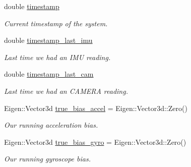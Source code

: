 \begin{DoxyCompactItemize}
\mbox{\label{classov__msckf_1_1Simulator_a159c617f73068f44833ed697255e5b86}} 
double \hyperlink{classov__msckf_1_1Simulator_a159c617f73068f44833ed697255e5b86}{timestamp}
\begin{DoxyCompactList}\small\item\em Current timestamp of the system. \end{DoxyCompactList}\item 
\mbox{\label{classov__msckf_1_1Simulator_ac7ab83038e9ef893633e4290e5342ac9}} 
double \hyperlink{classov__msckf_1_1Simulator_ac7ab83038e9ef893633e4290e5342ac9}{timestamp\+\_\+last\+\_\+imu}
\begin{DoxyCompactList}\small\item\em Last time we had an I\+MU reading. \end{DoxyCompactList}\item 
\mbox{\label{classov__msckf_1_1Simulator_a1e473df4f12ac26610c19bb0d4bc0a67}} 
double \hyperlink{classov__msckf_1_1Simulator_a1e473df4f12ac26610c19bb0d4bc0a67}{timestamp\+\_\+last\+\_\+cam}
\begin{DoxyCompactList}\small\item\em Last time we had an C\+A\+M\+E\+RA reading. \end{DoxyCompactList}\item 
\mbox{\label{classov__msckf_1_1Simulator_a9b97c9c0cc01e127bc9f178edd8b12c4}} 
Eigen\+::\+Vector3d \hyperlink{classov__msckf_1_1Simulator_a9b97c9c0cc01e127bc9f178edd8b12c4}{true\+\_\+bias\+\_\+accel} = Eigen\+::\+Vector3d\+::\+Zero()
\begin{DoxyCompactList}\small\item\em Our running acceleration bias. \end{DoxyCompactList}\item 
\mbox{\label{classov__msckf_1_1Simulator_a9ca24090484965ea8344a1b1605b963a}} 
Eigen\+::\+Vector3d \hyperlink{classov__msckf_1_1Simulator_a9ca24090484965ea8344a1b1605b963a}{true\+\_\+bias\+\_\+gyro} = Eigen\+::\+Vector3d\+::\+Zero()
\begin{DoxyCompactList}\small\item\em Our running gyroscope bias. \end{DoxyCompactList}\item 

\end{DoxyCompactItemize}
